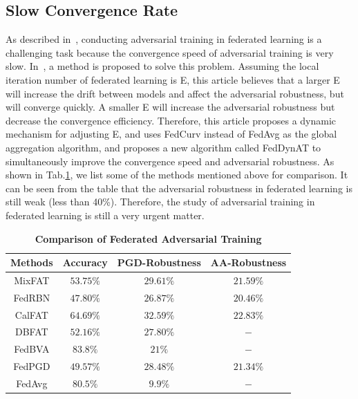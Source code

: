 \documentclass[pdflatex,sn-mathphys-num]{sn-jnl}%
\theoremstyle{thmstyleone}%
\theoremstyle{thmstyletwo}%
\theoremstyle{thmstylethree}%
\begin{document}
\subsection{Slow Convergence Rate}

As described in~\cite{zhang2023delving}, conducting adversarial training
in federated learning is a challenging task because the
convergence speed of adversarial training is very slow.
In~\cite{shah2021adversarial}, a method is proposed to solve this problem.
Assuming the local iteration number of federated learning
is E, this article believes that a larger E will increase the
drift between models and affect the adversarial robustness,
but will converge quickly. A smaller E will increase
the adversarial robustness but decrease the convergence
eﬀiciency. Therefore, this article proposes a dynamic
mechanism for adjusting E, and uses FedCurv instead of
FedAvg as the global aggregation algorithm, and proposes
a new algorithm called FedDynAT to simultaneously
improve the convergence speed and adversarial robustness.
As shown in Tab.\ref{Comparison of FAT}, we list some of the methods
mentioned above for comparison. It can be seen from the
table that the adversarial robustness in federated learning
is still weak (less than 40\%). Therefore, the study of
adversarial training in federated learning is still a very
urgent matter.


\begin{table}[t]
    \caption{\textbf{Comparison of Federated Adversarial Training}}
    \label{Comparison of FAT}
    \centering
    \begin{tabular}{|c|c|c|c|} %
    \toprule %
    \textbf{Methods}  & \textbf{Accuracy} & \textbf{PGD-Robustness} & \textbf{AA-Robustness}\\ 
    \midrule
     MixFAT& $53.75\%$ &   $29.61\%$ &   $21.59\%$ \\
     \midrule
     FedRBN& $47.80\%$ &  $26.87\%$ & $20.46\%$ \\
     \midrule
     CalFAT& $64.69\%$ & $32.59\%$  & $22.83\%$ \\
     \midrule
     DBFAT& $52.16\%$ &  $27.80\%$ & $-$ \\
     \midrule
     FedBVA& $83.8\%$ &  $21\%$ & $-$ \\
     \midrule
     FedPGD& $49.57\%$ &  $28.48\%$ &  $21.34\%$ \\
     \midrule
     FedAvg& $80.5\%$ &  $9.9\%$ & $-$ \\
    \toprule
    \end{tabular}
    \end{table}  
\end{document}
